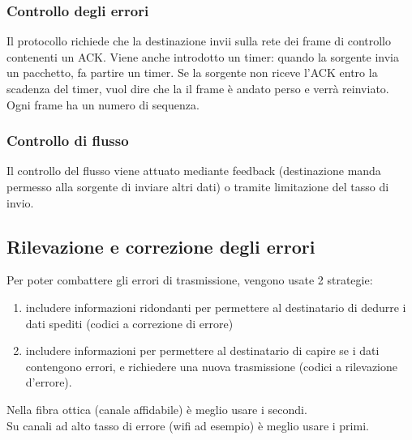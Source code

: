 \documentclass{article}
\begin{document}
\subsubsection{Controllo degli errori}
Il protocollo richiede che la destinazione invii sulla rete dei frame di controllo contenenti un ACK. Viene anche introdotto un timer: quando la sorgente invia un pacchetto, fa partire un timer. Se la sorgente non riceve l'ACK entro la scadenza del timer, vuol dire che la il frame è andato perso e verrà reinviato. \\
Ogni frame ha un numero di sequenza.
\subsubsection{Controllo di flusso}
Il controllo del flusso viene attuato mediante feedback (destinazione manda permesso alla sorgente di inviare altri dati) o tramite limitazione del tasso di invio.
\subsection{Rilevazione e correzione degli errori}
Per poter combattere gli errori di trasmissione, vengono usate 2 strategie:
\begin{enumerate}
\item includere informazioni ridondanti per permettere al destinatario di dedurre i dati spediti (codici a correzione di errore)
\item includere informazioni per permettere al destinatario di capire se i dati contengono errori, e richiedere una nuova trasmissione (codici a rilevazione d'errore).
\end{enumerate}
Nella fibra ottica (canale affidabile) è meglio usare i secondi. \\
Su canali ad alto tasso di errore (wifi ad esempio) è meglio usare i primi.\\
\end{document}
